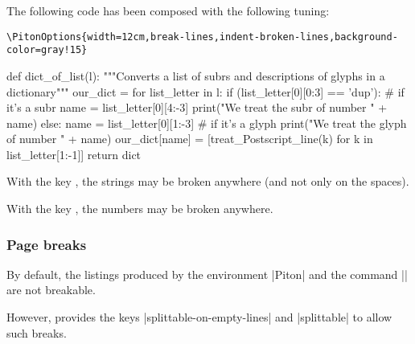 \documentclass{article}
\begin{document}
\bigskip
The following code has been composed with the following tuning:

\begin{Verbatim}
\PitonOptions{width=12cm,break-lines,indent-broken-lines,background-color=gray!15}
\end{Verbatim}

\begin{center}
\begin{Piton}
def dict_of_list(l):
    """Converts a list of subrs and descriptions of glyphs in a dictionary"""
    our_dict = {}
    for list_letter in l:
        if (list_letter[0][0:3] == 'dup'): # if it's a subr
            name = list_letter[0][4:-3]
            print("We treat the subr of number " + name)
        else:
            name = list_letter[0][1:-3] # if it's a glyph
            print("We treat the glyph of number " + name)
        our_dict[name] = [treat_Postscript_line(k) for k in list_letter[1:-1]]
    return dict
\end{Piton}
\end{center}

\bigskip
With the key , the strings may be broken
anywhere (and not only on the spaces). 

\bigskip
With the key , the numbers may be broken
anywhere.

\subsubsection{Page breaks}
\label{page breaks}
\label{splittable}

By default, the listings produced by the environment |{Piton}| and the command
|\PitonInputFile| are not breakable.

However,  provides the keys |splittable-on-empty-lines| and
|splittable| to allow such breaks.
\end{document}
